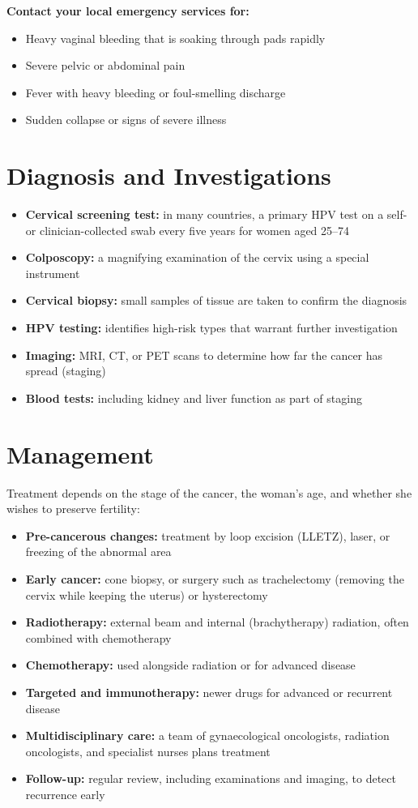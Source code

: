 \textbf{Contact your local emergency services for:}
\begin{itemize}
    \item Heavy vaginal bleeding that is soaking through pads rapidly
    \item Severe pelvic or abdominal pain
    \item Fever with heavy bleeding or foul-smelling discharge
    \item Sudden collapse or signs of severe illness
\end{itemize}

\section*{Diagnosis and Investigations}
\begin{itemize}
    \item \textbf{Cervical screening test:} in many countries, a primary HPV test on a self- or clinician-collected swab every five years for women aged 25--74
    \item \textbf{Colposcopy:} a magnifying examination of the cervix using a special instrument
    \item \textbf{Cervical biopsy:} small samples of tissue are taken to confirm the diagnosis
    \item \textbf{HPV testing:} identifies high-risk types that warrant further investigation
    \item \textbf{Imaging:} MRI, CT, or PET scans to determine how far the cancer has spread (staging)
    \item \textbf{Blood tests:} including kidney and liver function as part of staging
\end{itemize}

\section*{Management}
Treatment depends on the stage of the cancer, the woman's age, and whether she wishes to preserve fertility:

\begin{itemize}
    \item \textbf{Pre-cancerous changes:} treatment by loop excision (LLETZ), laser, or freezing of the abnormal area
    \item \textbf{Early cancer:} cone biopsy, or surgery such as trachelectomy (removing the cervix while keeping the uterus) or hysterectomy
    \item \textbf{Radiotherapy:} external beam and internal (brachytherapy) radiation, often combined with chemotherapy
    \item \textbf{Chemotherapy:} used alongside radiation or for advanced disease
    \item \textbf{Targeted and immunotherapy:} newer drugs for advanced or recurrent disease
    \item \textbf{Multidisciplinary care:} a team of gynaecological oncologists, radiation oncologists, and specialist nurses plans treatment
    \item \textbf{Follow-up:} regular review, including examinations and imaging, to detect recurrence early
\end{itemize}

